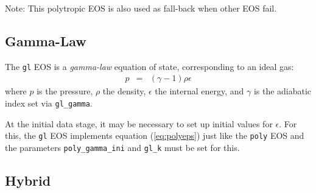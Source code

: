 Note: This polytropic EOS is also used as fall-back when other
EOS fail.

\subsection{Gamma-Law}

The \texttt{gl} EOS is a \emph{gamma-law} equation of state,
corresponding to an ideal gas:
\begin{eqnarray}
  p & = & (\gamma-1) \rho \epsilon
\end{eqnarray}
where $p$ is the pressure, $\rho$ the density, $\epsilon$ the internal
energy, and $\gamma$ is the adiabatic index set via
\texttt{gl\_gamma}.

At the initial data stage, it may be necessary to set up initial
values for $\epsilon$. For this, the \texttt{gl} EOS 
implements equation (\ref{eq:polyeps}) just like the \texttt{poly}
EOS and the parameters \texttt{poly\_gamma\_ini} and 
\texttt{gl\_k} must be set for this.




\subsection{Hybrid}

